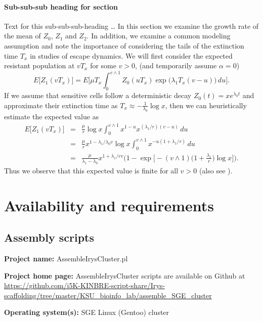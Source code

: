 \documentclass{bmcart}
\begin{document}
\paragraph*{Sub-sub-sub heading for section}
Text for this sub-sub-sub-heading \ldots
In this section we examine the growth rate of the mean of $Z_0$, $Z_1$ and $Z_2$. In
addition, we examine a common modeling assumption and note the
importance of considering the tails of the extinction time $T_x$ in
studies of escape dynamics.
We will first consider the expected resistant population at $vT_x$ for
some $v>0$, (and temporarily assume $\alpha=0$)
%
\[
 E \bigl[Z_1(vT_x) \bigr]= E
\biggl[\mu T_x\int_0^{v\wedge
1}Z_0(uT_x)
\exp \bigl(\lambda_1T_x(v-u) \bigr)\,du \biggr].
\]
%
If we assume that sensitive cells follow a deterministic decay
$Z_0(t)=xe^{\lambda_0 t}$ and approximate their extinction time as
$T_x\approx-\frac{1}{\lambda_0}\log x$, then we can heuristically
estimate the expected value as
%
\begin{eqnarray}\label{eqexpmuts}
E\bigl[Z_1(vT_x)\bigr] &=& \frac{\mu}{r}\log x
\int_0^{v\wedge1}x^{1-u}x^{({\lambda_1}/{r})(v-u)}\,du
\nonumber\\
&=& \frac{\mu}{r}x^{1-{\lambda_1}/{\lambda_0}v}\log x\int_0^{v\wedge
1}x^{-u(1+{\lambda_1}/{r})}\,du
\nonumber\\
&=& \frac{\mu}{\lambda_1-\lambda_0}x^{1+{\lambda_1}/{r}v} \biggl(1-\exp \biggl[-(v\wedge1) \biggl(1+
\frac{\lambda_1}{r}\biggr)\log x \biggr] \biggr).
\end{eqnarray}
%
Thus we observe that this expected value is finite for all $v>0$ (also see \cite{koon,khar,zvai,xjon,marg}).

\section*{Availability and requirements}

\subsection*{\textbf{Assembly scripts}}

\textbf{Project name:} AssembleIrysCluster.pl

\textbf{Project home page:} AssembleIrysCluster scripts are available on Github at \url{https://github.com/i5K-KINBRE-script-share/Irys-scaffolding/tree/master/KSU\_bioinfo\_lab/assemble\_SGE\_cluster}

\textbf{Operating system(s):} SGE Linux (Gentoo) cluster
\end{document}
